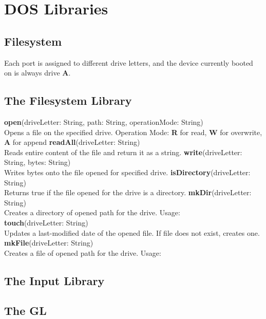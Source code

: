\chapter{DOS Libraries}

\section{Filesystem}

Each port is assigned to different drive letters, and the device currently booted on is always drive \textbf{A}.

\section{The Filesystem Library}


\begin{outline}
\1\textbf{open}(driveLetter: String, path: String, operationMode: String)
\\Opens a file on the specified drive.
 \2Operation Mode: \textbf{R} for read, \textbf{W} for overwrite, \textbf{A} for append
\1\textbf{readAll}(driveLetter: String)
\\Reads entire content of the file and return it as a string.
\1\textbf{write}(driveLetter: String, bytes: String)
\\Writes bytes onto the file opened for specified drive.
\1\textbf{isDirectory}(driveLetter: String)
\\Returns true if the file opened for the drive is a directory.
\1\textbf{mkDir}(driveLetter: String)
\\Creates a directory of opened path for the drive. Usage:
\\
\1\textbf{touch}(driveLetter: String)
\\Updates a last-modified date of the opened file. If file does not exist, creates one.
\1\textbf{mkFile}(driveLetter: String)
\\Creates a file of opened path for the drive. Usage:
\\
\end{outline}



\section{The Input Library}


\begin{outline}
\end{outline}



\section{The GL}


\begin{outline}
\end{outline}
